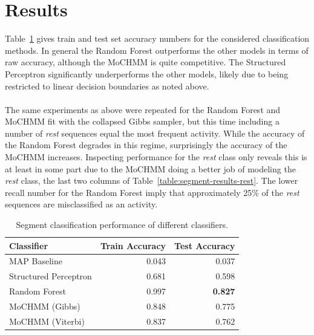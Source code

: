 \documentclass[12pt]{report}
\newcommand{\1}[0]{\mathbbm{1}}
\begin{document}
\section{Results}
Table~\ref{table:segment-results} gives train and test set accuracy numbers for the
considered classification methods. In general the Random Forest outperforms the other
models in terms of raw accuracy, although the \ac{MoCHMM} is quite competitive.
The Structured Perceptron significantly underperforms the other models,
likely due to being restricted to linear decision boundaries as noted above.
\\\\
The same experiments as above were repeated for the Random Forest and \ac{MoCHMM} fit with
the collapsed Gibbs sampler, but this time including a number of \emph{rest} sequences
equal the most frequent activity. While the accuracy of the Random Forest degrades in this regime,
surprisingly the accuracy of the \ac{MoCHMM} increases. Inspecting performance for the \emph{rest} class only
reveals this is at least in some part due to the \ac{MoCHMM} doing a better job of modeling
the \emph{rest} class, the last two columns of Table~\ref{table:segment-results-rest}.
The lower recall number for the Random Forest imply that approximately 25\% of the \emph{rest}
sequences are misclassified as an activity.
\begin{table}[ht]
    \centering
    \begin{tabular}{l r r}\hline
    \textbf{Classifier} & \textbf{Train Accuracy} &\textbf{Test Accuracy} \\\hline
    MAP Baseline & 0.043 & 0.037 \\
    Structured Perceptron & 0.681 & 0.598 \\
    Random Forest & 0.997 & \textbf{0.827} \\
    MoCHMM (Gibbs) & 0.848 & 0.775 \\
    MoCHMM (Viterbi) & 0.837 & 0.762 \\
    \end{tabular}
    \caption[Performance on the segmented exercise task]{
        Segment classification performance of different classifiers.
    }
    \label{table:segment-results}
\end{table}
\end{document}
